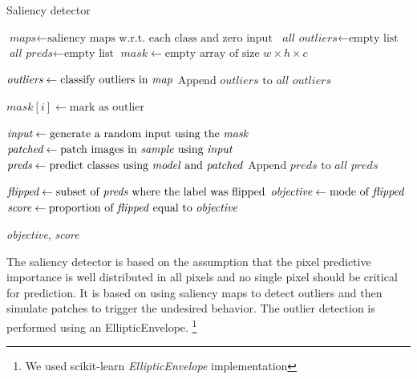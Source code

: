 \documentclass[letterpaper, 10 pt, conference]{ieeeconf}  %
\begin{document}
\begin{algorithm}
\caption{Saliency detector}\label{euclid}

\begin{algorithmic}[1]

\State $\textit{maps} \gets \text{saliency maps w.r.t. each class and zero input}$
\State $\textit{all outliers} \gets \text{empty list}$
\State $\textit{all preds} \gets \text{empty list}$
\State $\textit{mask} \gets \text{empty array of size } w \times h \times c$

    \State $\textit{outliers} \gets \text{classify outliers in \textit{map}}$
    \State $\text{Append } \textit{outliers} \text{ to}\textit{ all outliers}$
\EndFor


        \State $\textit{mask}[i] \gets \text{mark as outlier}$
    \EndIf
\EndFor

    \State $\textit{input} \gets \text{generate a random input using the \textit{mask}}$
    \State $\textit{patched} \gets \text{patch images in \textit{sample} using \textit{input}}$
    \State $\textit{preds} \gets \text{predict classes using \textit{model} and \textit{patched}}$
    \State $\text{Append } \textit{preds} \text{ to}\textit{ all preds}$
\EndFor

\State $\textit{flipped} \gets \text{subset of \textit{preds} where the label was flipped}$
\State $\textit{objective} \gets \text{mode of \textit{flipped}}$
\State $\textit{score} \gets \text{proportion of \textit{flipped} equal to \textit{objective}}$

\Return \textit{objective}, \textit{score}

\EndFunction
\end{algorithmic}

\end{algorithm}

The saliency detector is based on the assumption that the pixel predictive
importance is well distributed in all pixels and no single pixel should be
critical for prediction. It is based on using saliency maps \cite{saliency}
to detect outliers and then simulate patches to trigger the undesired
behavior. The outlier detection is performed using an EllipticEnvelope.
\footnote{We used scikit-learn \textit{EllipticEnvelope} implementation}
\end{document}
